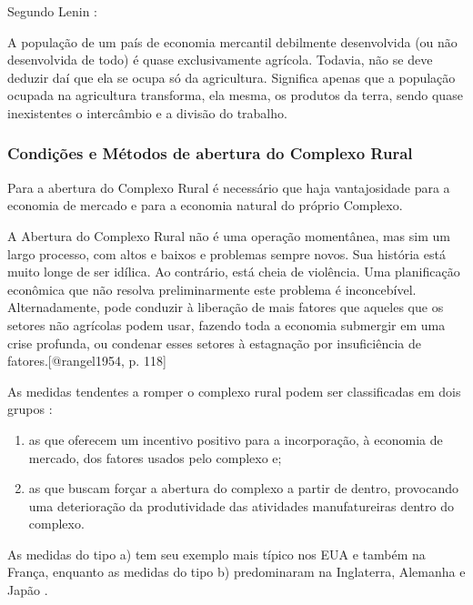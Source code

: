 \documentclass[
	12pt,				%
	oneside,			%
	a4paper,			%
	chapter=TITLE,		%
	section=TITLE,		%
	english,			%
	brazil				%
	]{abntex2}
\begin{document}
Segundo Lenin \autocite[\emph{apud}][99]{rangel1954}:
\begin{citacao} 
A população de um país de economia mercantil debilmente desenvolvida (ou não 
desenvolvida de todo) é quase exclusivamente agrícola. Todavia, não se deve 
deduzir daí que ela se ocupa só da agricultura. Significa apenas que a população 
ocupada na agricultura transforma, ela mesma, os produtos da terra, sendo quase 
inexistentes o intercâmbio e a divisão do trabalho. 
\end{citacao}
\hypertarget{condiuxe7uxf5es-e-muxe9todos-de-abertura-do-complexo-rural}{%
\subsubsection{Condições e Métodos de abertura do Complexo Rural}\label{condiuxe7uxf5es-e-muxe9todos-de-abertura-do-complexo-rural}}

Para a abertura do Complexo Rural é necessário que haja vantajosidade para a
economia de mercado e para a economia natural do próprio Complexo.
\begin{citacao} 
A Abertura do Complexo Rural não é uma operação momentânea, mas sim um largo
processo, com altos e baixos e problemas sempre novos. Sua história está muito
longe de ser idílica. Ao contrário, está cheia de violência. Uma planificação
econômica que não resolva preliminarmente este problema é inconcebível.
Alternadamente, pode conduzir à liberação de mais fatores que aqueles que os
setores não agrícolas podem usar, fazendo toda a economia submergir em uma crise
profunda, ou condenar esses setores à estagnação por insuficiência de
fatores.[@rangel1954, p. 118]
\end{citacao}
As medidas tendentes a romper o complexo rural podem ser classificadas em dois
grupos \autocite[113]{rangel1954}:
\begin{enumerate}
\def\labelenumi{\alph{enumi}.}
\item
  as que oferecem um incentivo positivo para a incorporação, à economia de
  mercado, dos fatores usados pelo complexo e;
\item
  as que buscam forçar a abertura do complexo a partir de dentro, provocando
  uma deterioração da produtividade das atividades manufatureiras dentro do
  complexo.
\end{enumerate}
As medidas do tipo a) tem seu exemplo mais típico nos EUA e também na França,
enquanto as medidas do tipo b) predominaram na Inglaterra, Alemanha e Japão
\autocite[114-115]{rangel1954}.
\end{document}
